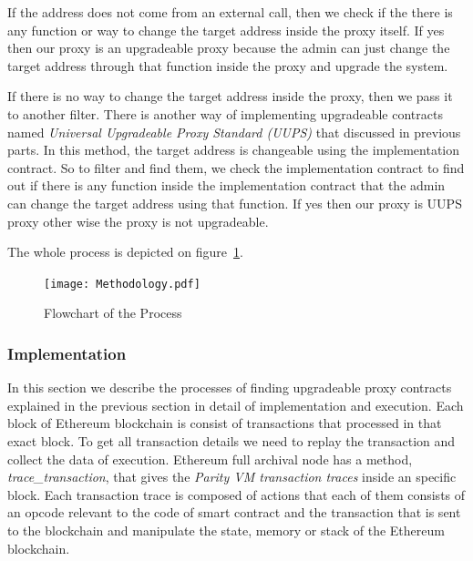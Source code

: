 If the address does not come from an external call, then we check if the there is any function or way to change the target address inside the proxy itself. If yes then our proxy is an upgradeable proxy because the admin can just change the target address through that function inside the proxy and upgrade the system.

If there is no way to change the target address inside the proxy, then we pass it to another filter. There is another way of implementing upgradeable contracts named \textit{Universal Upgradeable Proxy Standard (UUPS)} that discussed in previous parts. In this method, the target address is changeable using the implementation contract. So to filter and find them, we check the implementation contract to find out if there is any function inside the implementation contract that the admin can change the target address using that function. If yes then our proxy is UUPS proxy other wise the proxy is not upgradeable.

The whole process is depicted on figure~\ref{flowchart}.

\begin{figure}[t]
  \texttt{[image: Methodology.pdf]}\label{flowchart}
  \caption{Flowchart of the Process}
\end{figure}


\subsubsection{Implementation}\label{findingProxies}
In this section we describe the processes of finding upgradeable proxy contracts explained in the previous section in detail of implementation and execution. 
Each block of Ethereum blockchain is consist of transactions that processed in that exact block. To get all transaction details we need to replay the transaction and collect the data of execution. Ethereum full archival node has a method, \textit{trace\_transaction},  that gives the \textit{Parity VM transaction traces} inside an specific block. Each transaction trace is composed of actions that each of them consists of an opcode relevant to the code of smart contract and the transaction that is sent to the blockchain and manipulate the state, memory or stack of the Ethereum blockchain. 

